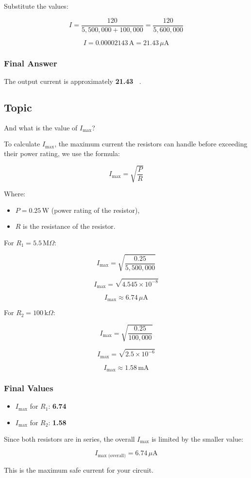 \documentclass{article}
\begin{document}
	Substitute the values:
	
	\[
	I = \frac{120}{5,500,000 + 100,000} = \frac{120}{5,600,000}
	\]
	
	\[
	I = 0.00002143 \, \text{A} = 21.43 \, \mu\text{A}
	\]
	
	\subsubsection*{Final Answer}
	
	The output current is approximately \textbf{21.43 \, \mu{}}.

\subsection*{Topic}

And what is the value of \( I_{\text{max}} \)?

To calculate \( I_{\text{max}} \), the maximum current the resistors can handle before exceeding their power rating, we use the formula:

\[
I_{\text{max}} = \sqrt{\frac{P}{R}}
\]

Where:
\begin{itemize}
	\item \( P = 0.25 \, \text{W} \) (power rating of the resistor),
	\item \( R \) is the resistance of the resistor.
\end{itemize}

For \( R_1 = 5.5 \, \text{M}\Omega \):

\[
I_{\text{max}} = \sqrt{\frac{0.25}{5,500,000}} 
\]

\[
I_{\text{max}} = \sqrt{4.545 \times 10^{-8}} 
\]

\[
I_{\text{max}} \approx 6.74 \, \mu\text{A}
\]

For \( R_2 = 100 \, \text{k}\Omega \):

\[
I_{\text{max}} = \sqrt{\frac{0.25}{100,000}} 
\]

\[
I_{\text{max}} = \sqrt{2.5 \times 10^{-6}} 
\]

\[
I_{\text{max}} \approx 1.58 \, \text{mA}
\]

\subsubsection*{Final Values}

\begin{itemize}
	\item \( I_{\text{max}} \) for \( R_1 \): \textbf{6.74 \, \mu{}}

	\item \( I_{\text{max}} \) for \( R_2 \): \textbf{1.58 \, }
\end{itemize}

Since both resistors are in series, the overall \( I_{\text{max}} \) is limited by the smaller value:

\[
I_{\text{max (overall)}} = 6.74 \, \mu\text{A}
\]

This is the maximum safe current for your circuit.
\end{document}
